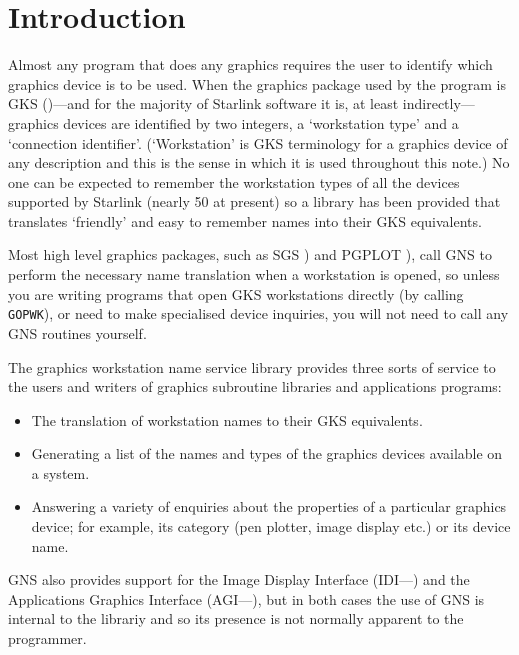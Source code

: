 \documentclass[twoside,11pt,nolof]{starlink}
\begin{document}
\scfrontmatter

\section{Introduction}\label{in}

Almost any program that does any graphics requires the user to identify which
graphics device is to be used. When the graphics package used by the program is
GKS ()---and for the majority of Starlink
software it is, at least indirectly---graphics devices are
identified by two integers, a `workstation type' and a `connection
identifier'. (`Workstation' is GKS terminology for a graphics device of any
description and this is the sense in which it is used throughout this
note.) No one can be expected to remember the workstation types of all the
devices supported by Starlink (nearly 50 at present) so a library has been
provided that translates `friendly' and easy to remember names into their GKS
equivalents.

Most high level graphics packages, such as SGS )
and PGPLOT ), call GNS to
perform the necessary name translation when a workstation is opened, so
unless you are writing programs that open GKS workstations directly
(by calling \texttt{GOPWK}), or need to make specialised device inquiries,
you will not need to call any GNS routines yourself.

The graphics workstation name service library provides three sorts of service
to the users and writers of graphics subroutine libraries and applications
programs:

\begin{itemize}

\item The translation of workstation names to their GKS equivalents.

\item Generating a list of the names and types of the graphics devices
available on a system.

\item Answering a variety of enquiries about the properties of a particular
graphics device; for example, its category (pen plotter, image display
etc.) or its device name.

\end{itemize}

GNS also provides support for the Image Display Interface
(IDI---) and the
Applications Graphics Interface (AGI---),
but in both cases the use of GNS
is internal to the librariy and so its presence is not normally
apparent to the programmer.
\end{document}
